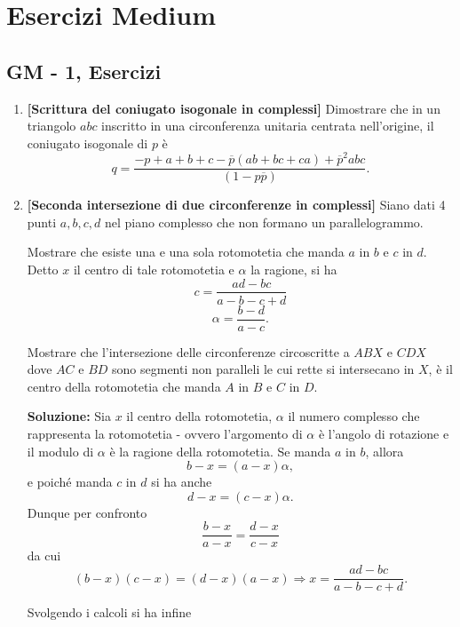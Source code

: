 \section{Esercizi Medium}
\subsection{GM - 1, Esercizi}
\begin{enumerate}
	\item \textbf{[Scrittura del coniugato isogonale in complessi]} Dimostrare che in un triangolo $abc$ inscritto in una
	circonferenza unitaria centrata nell'origine, il coniugato isogonale di $p$ è
	\begin{equation}
	q=\frac{-p+a+b+c-\overline{p}(ab+bc+ca)+\overline{p}^2abc}{(1-p\overline{p})}.
	\end{equation}
	\item \textbf{[Seconda intersezione di due circonferenze in complessi]} Siano dati 4 punti $a, b, c, d$ nel piano complesso che non formano un parallelogrammo.
	
	Mostrare che esiste una e una sola rotomotetia che
	manda $a$ in $b$ e $c$ in $d$. Detto $x$ il centro di tale rotomotetia e $\alpha$ la ragione, si ha
	$$
	c=\frac{ad-bc}{a-b-c+d}
	$$
	$$
	\alpha=\frac{b-d}{a-c}.
	$$
	
	Mostrare che l'intersezione delle circonferenze circoscritte a $ABX$ e $CDX$ dove $AC$ e $BD$ sono segmenti non paralleli le cui rette si intersecano in $X$, è il centro della rotomotetia che manda $A$ in $B$ e $C$ in $D$. 
	
	\textbf{Soluzione:} Sia $x$ il centro della rotomotetia, $\alpha$ il numero complesso che rappresenta la rotomotetia - ovvero l'argomento di $\alpha$ è l'angolo di rotazione e il modulo di $\alpha$ è la ragione della rotomotetia. Se manda $a$ in $b$, allora 
	$$
	b-x = (a-x)\alpha ,
	$$
	e poiché manda $c$ in $d$ si ha anche 
	$$
	d-x = (c-x)\alpha.
	$$
	Dunque per confronto 
	$$
	\frac{b-x}{a-x}=\frac{d-x}{c-x}
	$$
	da cui 
	$$
	(b-x)(c-x)=(d-x)(a-x)\Rightarrow x=\frac{ad-bc}{a-b-c+d}.
	$$
	
	Svolgendo i calcoli si ha infine
	

\end{enumerate}
